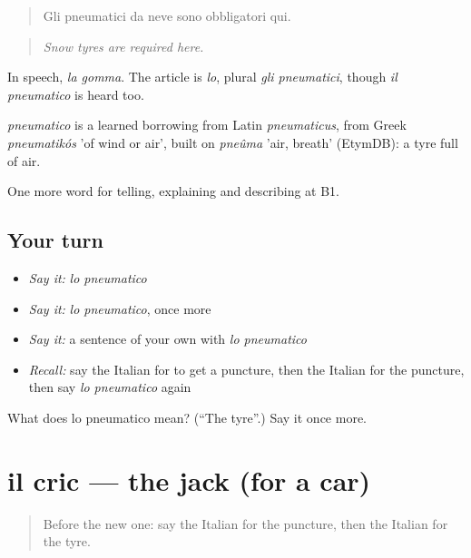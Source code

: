 \begin{quote}
Gli pneumatici da neve sono obbligatori qui.
\end{quote}

\begin{quote}
\emph{Snow tyres are required here.}
\end{quote}

In speech, \emph{la gomma}. The article is \emph{lo}, plural \emph{gli pneumatici}, though \emph{il pneumatico} is heard too.

\begin{cousinweb}
\emph{pneumatico} is a learned borrowing from Latin \emph{pneumaticus}, from Greek \emph{pneumatikós} 'of wind or air', built on \emph{pneûma} 'air, breath' (EtymDB): a tyre full of air.
\end{cousinweb}

\begin{grammarlens}[title={What you've built}]
One more word for telling, explaining and describing at B1.
\end{grammarlens}

\subsection*{Your turn}
\begin{itemize}
\raggedright
  \item \emph{Say it:} \emph{lo pneumatico}
  \item \emph{Say it:} \emph{lo pneumatico}, once more
  \item \emph{Say it:} a sentence of your own with \emph{lo pneumatico}
  \item \emph{Recall:} say the Italian for to get a puncture, then the Italian for the puncture, then say \emph{lo pneumatico} again
\end{itemize}

\begin{tcolorbox}[breakable,colback=teal!4,colframe=teal!35!black,title={Before you move on}]
What does lo pneumatico mean? (\textquotedblleft{}The tyre\textquotedblright{}.) Say it once more.
\end{tcolorbox}
\section[il cric]{il cric — the jack (for a car)}

\label{lesson:IT-C409-cric}



\begin{quote}
Before the new one: say the Italian for the puncture, then the Italian for the tyre.
\end{quote}

